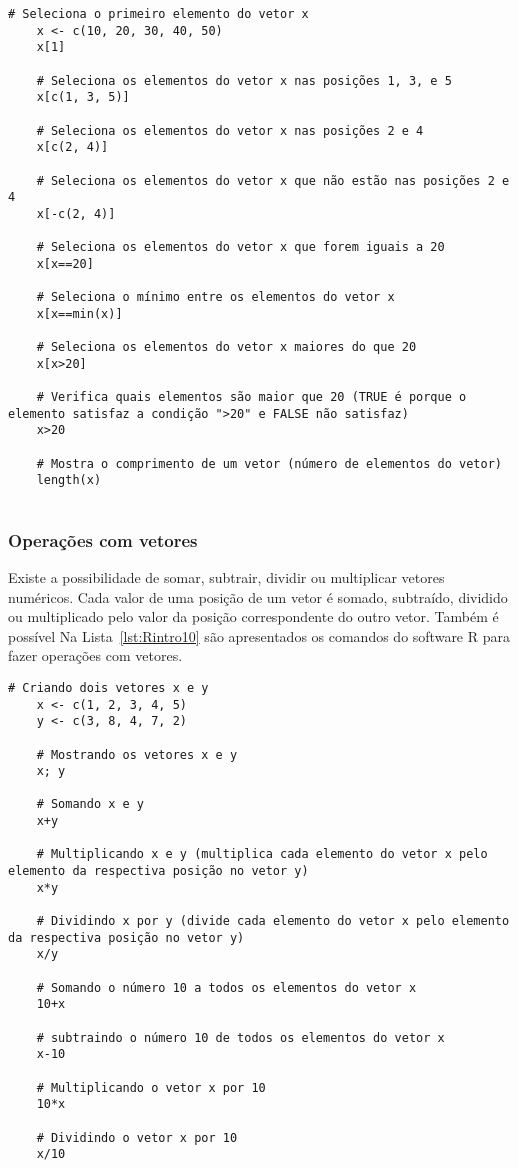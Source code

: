 \documentclass[11pt,fleqn]{book} %
\begin{document}
\begin{scriptsize}
	\estiloR
	\begin{lstlisting}[caption={Comandos do software R}, label=lst:Rintro9]
	# Seleciona o primeiro elemento do vetor x
	x <- c(10, 20, 30, 40, 50)
	x[1]
	
	# Seleciona os elementos do vetor x nas posições 1, 3, e 5
	x[c(1, 3, 5)]
	
	# Seleciona os elementos do vetor x nas posições 2 e 4
	x[c(2, 4)]
	
	# Seleciona os elementos do vetor x que não estão nas posições 2 e 4
	x[-c(2, 4)]
	
	# Seleciona os elementos do vetor x que forem iguais a 20
	x[x==20]
	
	# Seleciona o mínimo entre os elementos do vetor x
	x[x==min(x)]
	
	# Seleciona os elementos do vetor x maiores do que 20
	x[x>20]
	
	# Verifica quais elementos são maior que 20 (TRUE é porque o elemento satisfaz a condição ">20" e FALSE não satisfaz)
	x>20
	
	# Mostra o comprimento de um vetor (número de elementos do vetor)
	length(x)
	
	\end{lstlisting}
\end{scriptsize}


\subsubsection{Operações com vetores}

Existe a possibilidade de somar, subtrair, dividir ou multiplicar vetores numéricos. Cada valor de uma posição de um vetor é somado, subtraído, dividido ou multiplicado pelo valor da posição correspondente do outro vetor. Também é possível 
Na Lista~\ref{lst:Rintro10} são apresentados os comandos do software R para fazer operações com vetores. \\

\begin{scriptsize}
	\estiloR
	\begin{lstlisting}[caption={Comandos do software R}, label=lst:Rintro10]
	# Criando dois vetores x e y
	x <- c(1, 2, 3, 4, 5)
	y <- c(3, 8, 4, 7, 2)
	
	# Mostrando os vetores x e y
	x; y
	
	# Somando x e y
	x+y
	
	# Multiplicando x e y (multiplica cada elemento do vetor x pelo elemento da respectiva posição no vetor y)
	x*y
	
	# Dividindo x por y (divide cada elemento do vetor x pelo elemento da respectiva posição no vetor y)
	x/y
	
	# Somando o número 10 a todos os elementos do vetor x
	10+x
	
	# subtraindo o número 10 de todos os elementos do vetor x
	x-10
	
	# Multiplicando o vetor x por 10 
	10*x
	
	# Dividindo o vetor x por 10
	x/10
	
	\end{lstlisting}
\end{scriptsize}
\end{document}
